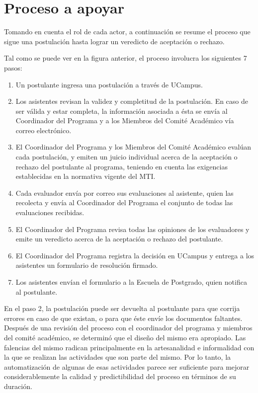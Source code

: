\section{Proceso a apoyar}

Tomando en cuenta el rol de cada actor, a continuación se resume el proceso que
sigue una postulación hasta lograr un veredicto de aceptación o rechazo.


Tal como se puede ver en la figura anterior, el proceso involucra los siguientes
7 pasos:

\begin{enumerate}
    \item Un postulante ingresa una postulación a través de UCampus.
    \item Los asistentes revisan la validez y completitud de la postulación. En
    caso de ser válida y estar completa, la información asociada a ésta se envía
    al Coordinador del Programa y a los Miembros del Comité Académico vía correo
    electrónico.
    \item El Coordinador del Programa y los Miembros del Comité Académico
    evalúan cada postulación, y emiten un juicio individual acerca de la
    aceptación o rechazo del postulante al programa, teniendo en cuenta las
    exigencias establecidas en la normativa vigente del MTI.
    \item Cada evaluador envía por correo sus evaluaciones al asistente, quien
    las recolecta y envía al Coordinador del Programa el conjunto de todas las
    evaluaciones recibidas.
    \item El Coordinador del Programa revisa todas las opiniones de los
    evaluadores y emite un veredicto acerca de la aceptación o rechazo del
    postulante.
    \item El Coordinador del Programa registra la decisión en UCampus y entrega
    a los asistentes un formulario de resolución firmado.
    \item Los asistentes envían el formulario a la Escuela de Postgrado, quien
    notifica al postulante.
\end{enumerate}

En el paso 2, la postulación puede ser devuelta al postulante para que corrija
errores en caso de que existan, o para que éste envíe los documentos faltantes.
Después de una revisión del proceso con el coordinador del programa y miembros
del comité académico, se determinó que el diseño del mismo era apropiado. Las
falencias del mismo radican principalmente en la artesanalidad e informalidad
con la que se realizan las actividades que son parte del mismo. Por lo tanto, la
automatización de algunas de esas actividades parece ser suficiente para mejorar
considerablemente la calidad y predictibilidad del proceso en términos de su
duración.

